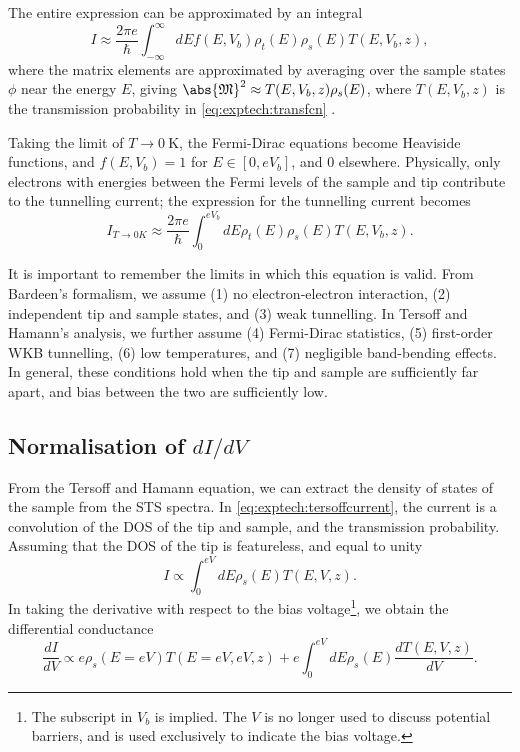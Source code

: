 The entire expression can be approximated by an integral
\begin{equation}
    I \approx \frac{2\pi e}{\hbar} \int_{-\infty}^\infty dE f(E,V_b) \rho_t(E)\rho_s(E) T(E,V_b,z),
\end{equation}
where the matrix elements are approximated by averaging over the sample states $\phi$ near the energy $E$, giving $\abs{\mathfrak{M}}^2 \approx T(E,V_b,z) \rho_s(E)$, where $T(E,V_b,z)$ is the transmission probability in \autoref{eq:exptech:transfcn} .

Taking the limit of $T \rightarrow \SI{0}{\kelvin}$, the Fermi-Dirac equations become Heaviside functions, and $f(E,V_b) = 1$ for $E \in [0,eV_b]$, and 0 elsewhere. Physically, only electrons with energies between the Fermi levels of the sample and tip contribute to the tunnelling current; the expression for the tunnelling current becomes
\begin{equation} \label{eq:exptech:tersoffcurrent}
I_{T \rightarrow 0K} \approx \frac{2\pi e}{\hbar} \int_{0} ^{eV_b} dE \rho_{t}(E) \rho_{s}(E) T(E,V_b,z).
\end{equation}

It is important to remember the limits in which this equation is valid. From Bardeen's formalism, we assume (1) no electron-electron interaction, (2) independent tip and sample states, and (3) weak tunnelling. In Tersoff and Hamann's analysis, we further assume (4) Fermi-Dirac statistics, (5) first-order \ac{WKB} tunnelling, (6) low temperatures, and (7) negligible band-bending effects. In general, these conditions hold when the tip and sample are sufficiently far apart, and bias between the two are sufficiently low.


\subsection{Normalisation of $dI/dV$}

From the Tersoff and Hamann equation, we can extract the density of states of the sample from the \ac{STS} spectra. In \autoref{eq:exptech:tersoffcurrent}, the current is a convolution of the \ac{DOS} of the tip and sample, and the transmission probability. Assuming that the \ac{DOS} of the tip is featureless, and equal to unity
\begin{equation}
I \propto \int_0 ^{eV} dE \rho_s(E) T(E,V,z) .
\end{equation}
In taking the derivative with respect to the bias voltage\footnote{The subscript in $V_b$ is implied. The $V$ is no longer used to discuss potential barriers, and is used exclusively to indicate the bias voltage.}, we obtain the differential conductance
\begin{equation} \label{eq:exptech:didv}
\frac{dI}{dV} \propto e \rho_s(E=eV) T(E=eV,eV,z) + e \int_0^{eV} dE \rho_s(E) \frac{dT(E,V,z)}{dV}  .
\end{equation}

